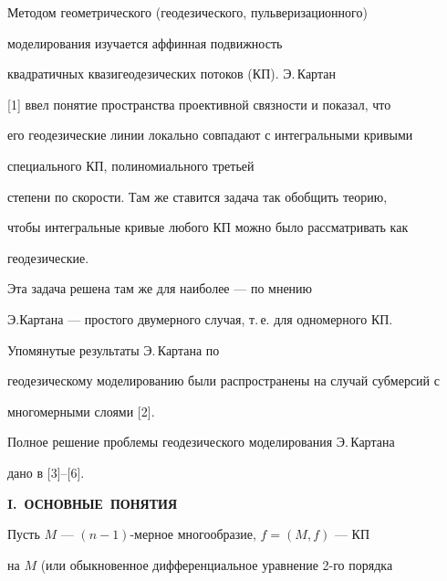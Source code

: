 \pagestyle{plain} %







\maketitle


\label{begin}








Методом геометрического (геодезического, пульверизационного)


моделирования изучается аффинная подвижность


квадратичных квазигеодезических потоков (КП). Э.\,Картан


[1] ввел понятие пространства проективной связности и показал, что


его геодезические линии локально совпадают с интегральными кривыми


специального КП, полиномиального третьей


степени по скорости. Там же ставится задача так обобщить теорию,


чтобы интегральные кривые любого КП можно было рассматривать как


геодезические.


Эта задача решена там же для наиболее --- по мнению


Э.Картана --- простого двумерного случая, т.\,е. для одномерного КП.


Упомянутые результаты Э.\,Картана по


геодезическому моделированию были распространены на случай субмерсий с


многомерными слоями [2].


Полное решение проблемы геодезического моделирования Э.\,Картана


дано в [3]--[6].


\medskip





\centerline{\bf I.~ОСНОВНЫЕ~ПОНЯТИЯ}


\medskip





Пусть $M$ --- $(n-1)$-мерное многообразие, $f=(M,f)$ --- КП


на $M$ (или обыкновенное дифференциальное уравнение 2-го порядка


